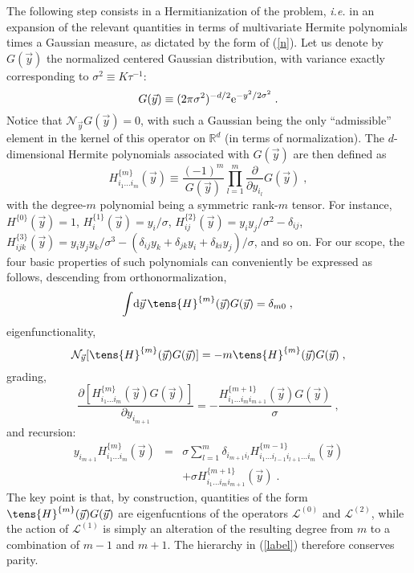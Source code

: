 The following step consists in a Hermitianization of the problem, \emph{i.e.} in an expansion of the relevant quantities
in terms of multivariate Hermite polynomials \cite{G49,S79,S99} times a Gaussian measure, as dictated by the form of (\ref{n}).
Let us denote by $G(\vec{y})$ the normalized centered Gaussian distribution, with variance exactly corresponding to $\sigma^2\equiv K\tau^{-1}$:
\begin{equation} \label{gaus}
 G(\vec{y})\equiv(2\pi\sigma^2)^{-d/2}\mathrm{e}^{-y^2/2\sigma^2}\;.
\end{equation}
Notice that $\mathcal{N}_{\vec{y}}G(\vec{y})=0$, with such a Gaussian being the only ``admissible'' element in the kernel of this operator on
$\mathbb{R}^d$ (in terms of normalization). The $d$-dimensional Hermite polynomials associated with $G(\vec{y})$ are then defined as
\begin{equation} \label{herm}
 H^{\{m\}}_{i_1\ldots i_m}(\vec{y})\equiv\frac{(-1)^m}{G(\vec{y})}\prod_{l=1}^m\frac{\partial}{\partial y_{i_l}}G(\vec{y})\;,
\end{equation}
with the degree-$m$ polynomial being a symmetric rank-$m$ tensor. For instance, $H^{\{0\}}(\vec{y})=1$, $H^{\{1\}}_i(\vec{y})=y_i/\sigma$,
$H^{\{2\}}_{ij}(\vec{y})=y_iy_j/\sigma^2-\delta_{ij}$, $H^{\{3\}}_{ijk}(\vec{y})=y_iy_jy_k/\sigma^3-(\delta_{ij}y_k+\delta_{jk}y_i+\delta_{ki}y_j)/\sigma$, and so on. For our scope, the four basic properties of such polynomials 
can conveniently be expressed as follows, descending from orthonormalization,
\[\!\int\!\ud\vec{y}\,\tens{H}^{\{m\}}(\vec{y})G(\vec{y})=\delta_{m0}\;,\]
eigenfunctionality,
\[\mathcal{N}_{\vec{y}}[\tens{H}^{\{m\}}(\vec{y})G(\vec{y})]=-m\tens{H}^{\{m\}}(\vec{y})G(\vec{y})\;,\]
grading,
\[\frac{\partial[H^{\{m\}}_{i_1\ldots i_m}(\vec{y})G(\vec{y})]}{\partial y_{i_{m+1}}}=-\frac{H^{\{m+1\}}_{i_1\ldots i_mi_{m+1}}(\vec{y})G(\vec{y})}{\sigma}\;,\]
and recursion:
\begin{eqnarray*}
 y_{i_{m+1}}H^{\{m\}}_{i_1\ldots i_m}(\vec{y})&=&\sigma\sum_{l=1}^m\delta_{i_{m+1}i_l}H^{\{m-1\}}_{i_1\ldots i_{l-1}i_{l+1}\ldots i_m}(\vec{y})\\
 &&+\sigma H^{\{m+1\}}_{i_1\ldots i_mi_{m+1}}(\vec{y})\;.
\end{eqnarray*}
The key point is that, by construction, quantities of the form $\tens{H}^{\{m\}}(\vec{y})G(\vec{y})$ are eigenfucntions of the operators
$\mathcal{L}^{(0)}$ and $\mathcal{L}^{(2)}$, while the action of $\mathcal{L}^{(1)}$ is simply an alteration of the resulting degree
from $m$ to a combination of $m-1$ and $m+1$. The hierarchy in (\ref{label}) therefore conserves parity.
 
